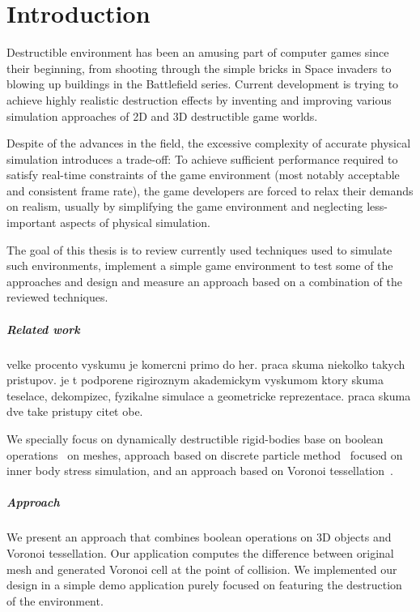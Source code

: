 \chapter*{Introduction}
Destructible environment has been an amusing part of computer games since their beginning, from shooting through the simple bricks in Space invaders to blowing up buildings in the Battlefield series. Current development is trying to achieve highly realistic destruction effects by inventing and improving various simulation approaches of 2D and 3D destructible game worlds.

Despite of the advances in the field, the excessive complexity of accurate physical simulation introduces a trade-off: To achieve sufficient performance required to satisfy real-time constraints of the game environment (most notably acceptable and consistent frame rate), the game developers are forced to relax their demands on realism, usually by simplifying the game environment and neglecting less-important aspects of physical simulation.

The goal of this thesis is to review currently used techniques used to simulate such environments, implement a simple game environment to test some of the approaches and design and measure an approach based on a combination of the reviewed techniques.


\paragraph{Related work}
velke procento vyskumu je komercni primo do her. praca skuma niekolko takych pristupov. je t podporene rigiroznym akademickym vyskumom ktory skuma teselace, dekompizec, fyzikalne simulace a geometricke reprezentace. praca skuma dve take pristupy citet obe. 




We specially focus on dynamically destructible rigid-bodies\cite{todo} base on boolean operations~\cite{geomod} on meshes, approach based on discrete particle method~\cite{edem} focused on inner body stress simulation, and an approach based on Voronoi tessellation~\cite{nvidia}. 


\paragraph{Approach}
We present an approach that combines boolean operations on 3D objects and Voronoi tessellation. Our application computes the difference between original mesh and generated Voronoi cell at the point of collision. We implemented our design in a simple demo application purely focused on featuring the destruction of the environment.

